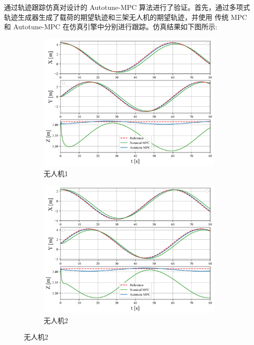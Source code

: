 \documentclass[lang=chs, degree=master, blindreview=false, winfonts=true]{yanputhesis}
\begin{document}
通过轨迹跟踪仿真对设计的 Autotune-MPC 算法进行了验证。首先，通过多项式轨迹生成器生成了载荷的期望轨迹和三架无人机的期望轨迹，并使用 传统 MPC 和 Autotune-MPC 在仿真引擎中分别进行跟踪。仿真结果如下图所示:
\begin{figure}[H]
	\centering
	\begin{subfigure}[b]{0.48\textwidth}
		\centering
		\includegraphics[width=\textwidth]{picture/kk2/quadrotor0.png}
		\caption{无人机1}
		\label{quadrotor0}
	\end{subfigure}
	\hfill
	\begin{subfigure}[b]{0.48\textwidth}
		\centering
		\includegraphics[width=\textwidth]{picture/kk2/quadrotor1.png}
		\caption{无人机2}
		\label{quadrotor1}
	\end{subfigure}
	

\end{figure}
\end{document}
